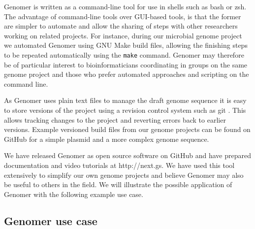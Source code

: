 \documentclass[10pt]{article}
\begin{document}
Genomer is written as a command-line tool for use in shells such as bash or
zsh. The advantage of command-line tools over GUI-based tools, is that the former
are simpler to automate and allow the sharing of steps with other researchers
working on related projects. For instance, during our microbial genome project
we automated Genomer using GNU Make build files, allowing the finishing steps
to be repeated automatically using the \verb+make+ command. Genomer may
therefore be of particular interest to bioinformaticians coordinating in groups
on the same genome project and those who prefer automated approaches and
scripting on the command line.

As Genomer uses plain text files to manage the draft genome sequence it is easy
to store versions of the project using a revision control system such as git
\cite{git-scm}. This allows tracking changes to the project and reverting
errors back to earlier versions. Example versioned build files from our genome
projects can be found on GitHub for a simple plasmid \cite{plasmid-github} and
a more complex genome \cite{genome-github} sequence.

We have released Genomer as open source software on GitHub
\cite{genomer-github} and have prepared documentation and video tutorials at
http://next.gs. We have used this tool extensively to simplify our own genome
projects and believe Genomer may also be useful to others in the field. We will
illustrate the possible application of Genomer with the following example use
case.

\subsection*{Genomer use case}
\end{document}
